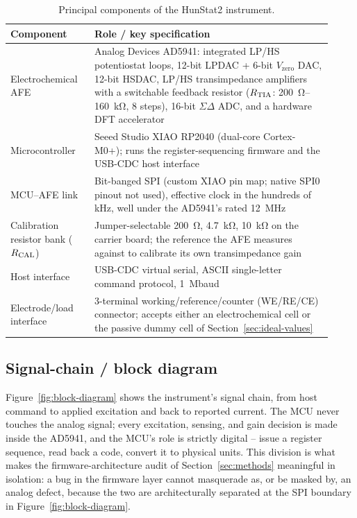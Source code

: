 \begin{table}[h]
\centering
\caption{Principal components of the HunStat2 instrument.}
\label{tab:components}
\begin{threeparttable}
\begin{tabular}{@{}p{0.24\linewidth}p{0.68\linewidth}@{}}
\toprule
Component & Role / key specification \\
\midrule
Electrochemical AFE & Analog Devices AD5941: integrated LP/HS
  potentiostat loops, 12-bit LPDAC + 6-bit $V_{\mathrm{zero}}$ DAC, 12-bit
  HSDAC, LP/HS transimpedance amplifiers with a switchable feedback
  resistor ($R_{\mathrm{TIA}}$: \SI{200}{\ohm}--\SI{160}{\kilo\ohm}, 8 steps), 16-bit
  $\Sigma\Delta$ ADC, and a hardware DFT accelerator~\cite{devices2024ad5940} \\
Microcontroller & Seeed Studio XIAO RP2040 (dual-core Cortex-M0+); runs
  the register-sequencing firmware and the USB-CDC host interface \\
MCU--AFE link & Bit-banged SPI (custom XIAO pin map; native SPI0 pinout
  not used), effective clock in the hundreds of kHz, well under the
  AD5941's rated \SI{12}{\mega\hertz}~\cite{devices2024ad5940} \\
Calibration resistor bank ($R_{\mathrm{CAL}}$) & Jumper-selectable \SI{200}{\ohm},
  \SI{4.7}{\kilo\ohm}, \SI{10}{\kilo\ohm} on the carrier board; the
  reference the AFE measures against to calibrate its own transimpedance
  gain \\
Host interface & USB-CDC virtual serial, ASCII single-letter command
  protocol, \SI{1}{\mega baud} \\
Electrode/load interface & 3-terminal working/reference/counter (WE/RE/CE)
  connector; accepts either an electrochemical cell or the passive dummy
  cell of Section~\ref{sec:ideal-values} \\
\bottomrule
\end{tabular}
\end{threeparttable}
\end{table}

\subsection{Signal-chain / block diagram}
\label{sec:block-diagram}
Figure~\ref{fig:block-diagram} shows the instrument's signal chain, from
host command to applied excitation and back to reported current. The MCU
never touches the analog signal; every excitation, sensing, and gain
decision is made inside the AD5941, and the MCU's role is strictly
digital -- issue a register sequence, read back a code, convert it to
physical units. This division is what makes the firmware-architecture audit
of Section~\ref{sec:methods} meaningful in isolation: a bug in the firmware
layer cannot masquerade as, or be masked by, an analog defect, because the
two are architecturally separated at the SPI boundary in
Figure~\ref{fig:block-diagram}.

